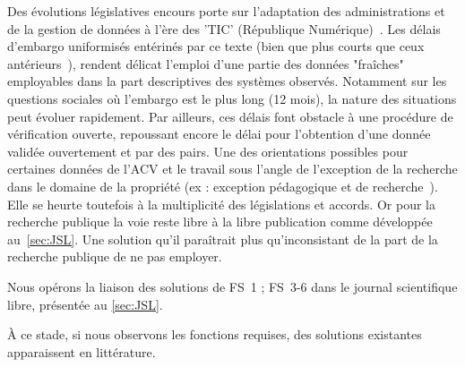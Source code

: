 {Des évolutions législatives encours porte sur l'adaptation des administrations et de la gestion de données à l'ère des 'TIC' (République Numérique)~\cite{_republique_2015}.
Les délais d'embargo uniformisés entérinés par ce texte (bien que plus courts que ceux antérieurs~\cite{gouzi_loi_2016}), rendent délicat l'emploi d'une partie des données "fraîches" employables dans la part descriptives des systèmes observés.
Notamment sur les questions sociales où l'embargo est le plus long (12 mois), la nature des situations peut évoluer rapidement.
Par ailleurs, ces délais font obstacle à une procédure de vérification ouverte, repoussant encore le délai pour l'obtention d'une donnée validée ouvertement et par des pairs.
Une des orientations possibles pour certaines données de l'\gls{ACV} et le travail sous l'angle de l'exception de la recherche dans le domaine de la propriété (ex : exception pédagogique et de recherche~\cite{_droit_????}).
Elle se heurte toutefois à la multiplicité des législations et accords.
Or pour la recherche publique la voie reste libre à la libre publication comme développée au~\ref{sec:JSL}.
Une solution qu'il paraîtrait plus qu'inconsistant de la part de la recherche publique de ne pas employer.

Nous opérons la liaison des solutions de FS~1 ; FS~3-6 dans le journal scientifique libre, présentée au \ref{sec:JSL}.

}

À ce stade, si nous observons les fonctions requises, des solutions existantes apparaissent en littérature.


